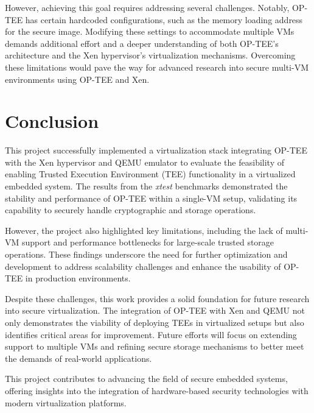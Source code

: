\documentclass[acmtog]{acmart}
\begin{document}
However, achieving this goal requires addressing several challenges. Notably, OP-TEE has certain hardcoded configurations, such as the memory loading address for the secure image. Modifying these settings to accommodate multiple VMs demands additional effort and a deeper understanding of both OP-TEE's architecture and the Xen hypervisor's virtualization mechanisms. Overcoming these limitations would pave the way for advanced research into secure multi-VM environments using OP-TEE and Xen.



\section{Conclusion}

This project successfully implemented a virtualization stack integrating OP-TEE with the Xen hypervisor and QEMU emulator to evaluate the feasibility of enabling Trusted Execution Environment (TEE) functionality in a virtualized embedded system. The results from the \textit{xtest} benchmarks demonstrated the stability and performance of OP-TEE within a single-VM setup, validating its capability to securely handle cryptographic and storage operations.

However, the project also highlighted key limitations, including the lack of multi-VM support and performance bottlenecks for large-scale trusted storage operations. These findings underscore the need for further optimization and development to address scalability challenges and enhance the usability of OP-TEE in production environments.

Despite these challenges, this work provides a solid foundation for future research into secure virtualization. The integration of OP-TEE with Xen and QEMU not only demonstrates the viability of deploying TEEs in virtualized setups but also identifies critical areas for improvement. Future efforts will focus on extending support to multiple VMs and refining secure storage mechanisms to better meet the demands of real-world applications.

This project contributes to advancing the field of secure embedded systems, offering insights into the integration of hardware-based security technologies with modern virtualization platforms.





\end{document}
